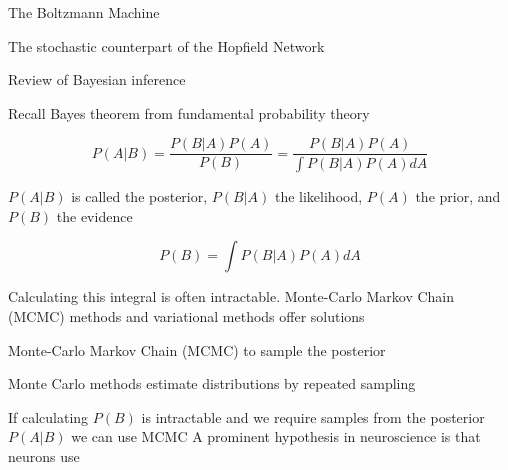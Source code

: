\documentclass[aspectratio=169]{beamer}
\begin{document}
\begin{frame}{The Boltzmann Machine}

The stochastic counterpart of the Hopfield Network

\end{frame}

\begin{frame}{Review of Bayesian inference}

Recall Bayes theorem from fundamental probability theory

\begin{equation*}
P(A|B) = \frac{P(B|A)P(A)}{P(B)} = \frac{P(B|A)P(A)}{\int P(B|A)P(A)dA}
\end{equation*}
\vfill

$P(A|B)$ is called the posterior, $P(B|A)$ the likelihood, $P(A)$ the prior, and $P(B)$ the evidence
\vfill

\begin{equation*}
P(B) = \int P(B|A)P(A)dA
\end{equation*}

Calculating this integral is often intractable. Monte-Carlo Markov Chain (MCMC) methods and variational methods offer solutions

\end{frame}

\begin{frame}{Monte-Carlo Markov Chain (MCMC) to sample the posterior}

Monte Carlo methods estimate distributions by repeated sampling

\vfill
If calculating $P(B)$ is intractable and we require samples from the posterior $P(A|B )$ we can use MCMC
\vfill
A prominent hypothesis in neuroscience is that neurons use 

\end{frame}
\end{document}

